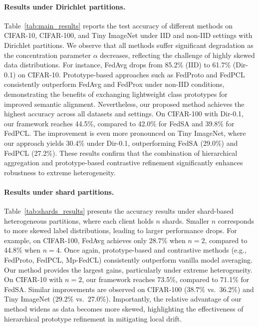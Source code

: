 \documentclass[twoside]{article}
\begin{document}
        \paragraph{Results under Dirichlet partitions.} 
            Table~\ref{tab:main_results} reports the test accuracy of different methods on CIFAR-10, CIFAR-100, and Tiny ImageNet under IID and non-IID settings with Dirichlet partitions. 
            We observe that all methods suffer significant degradation as the concentration parameter $\alpha$ decreases, reflecting the challenge of highly skewed data distributions. 
            For instance, FedAvg drops from 85.2\% (IID) to 61.7\% (Dir-0.1) on CIFAR-10. 
            Prototype-based approaches such as FedProto and FedPCL consistently outperform FedAvg and FedProx under non-IID conditions, demonstrating the benefits of exchanging lightweight class prototypes for improved semantic alignment. 
            Nevertheless, our proposed method achieves the highest accuracy across all datasets and settings. 
            On CIFAR-100 with Dir-0.1, our framework reaches 44.5\%, compared to 42.0\% for FedSA and 39.8\% for FedPCL. 
            The improvement is even more pronounced on Tiny ImageNet, where our approach yields 30.4\% under Dir-0.1, outperforming FedSA (29.0\%) and FedPCL (27.2\%). 
            These results confirm that the combination of hierarchical aggregation and prototype-based contrastive refinement significantly enhances robustness to extreme heterogeneity. 
            
            \paragraph{Results under shard partitions.} 
            Table~\ref{tab:shards_results} presents the accuracy results under shard-based heterogeneous partitions, where each client holds $n$ shards. 
            Smaller $n$ corresponds to more skewed label distributions, leading to larger performance drops. 
            For example, on CIFAR-100, FedAvg achieves only 28.7\% when $n=2$, compared to 44.8\% when $n=4$. 
            Once again, prototype-based and contrastive methods (e.g., FedProto, FedPCL, Mp-FedCL) consistently outperform vanilla model averaging. 
            Our method provides the largest gains, particularly under extreme heterogeneity. 
            On CIFAR-10 with $n=2$, our framework reaches 73.5\%, compared to 71.1\% for FedSA. 
            Similar improvements are observed on CIFAR-100 ($38.7\%$ vs.\ 36.2\%) and Tiny ImageNet ($29.2\%$ vs.\ 27.0\%). 
            Importantly, the relative advantage of our method widens as data becomes more skewed, highlighting the effectiveness of hierarchical prototype refinement in mitigating local drift. 
            
\end{document}
